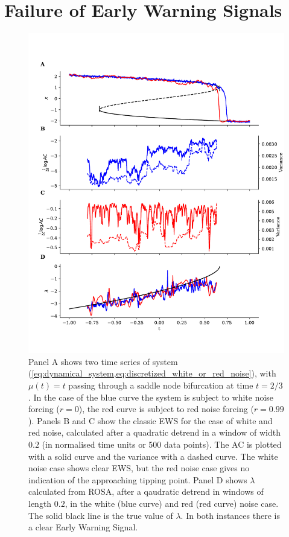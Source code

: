 \section{Failure of Early Warning Signals}\label{sec:failure}
\begin{figure}
\includegraphics[width=\textwidth,keepaspectratio]{figure1}
\caption[Early Warning Signals Failing]
{Panel A shows two time series of system (\cref{eq:dynamical_system,eq:discretized_white_or_red_noise}), with $\mu(t)=t$ passing through a saddle node bifurcation at time $t=2/3$. 
  In the case of the blue curve the system
  is subject to white noise forcing ($r=0$), the red curve is subject to 
  red noise forcing ($r=0.99$). Panels B and C show the
  classic EWS for the case of white and
  red noise, calculated after a
  quadratic detrend in a window of width $0.2$ (in normalised time units or 500 data points).
  The AC is plotted with a solid curve and
  the variance with a 
  dashed curve.
  The white noise case shows clear EWS, 
  but the red noise case gives no indication of the approaching tipping point. Panel D shows $\lambda$ calculated from ROSA, after a
  qaudratic detrend in windows of length $0.2$, in the
  white (blue curve) and red (red curve) noise case. The solid black 
  line is the true value of $\lambda$. In both instances there
  is a clear Early Warning Signal.}\label{fig:failure_of_ews}
\end{figure}

